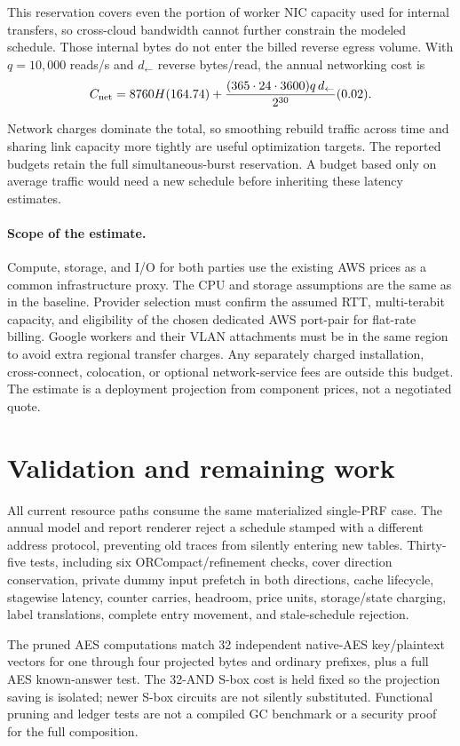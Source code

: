 \documentclass[11pt]{article}
\begin{document}

This reservation covers even the portion of worker NIC capacity used for
internal transfers, so cross-cloud bandwidth cannot further constrain the
modeled schedule. Those internal bytes do not enter the billed reverse
egress volume. With $q=10{,}000$ reads/s and $d_{\leftarrow}$ reverse
bytes/read, the annual networking cost is
\[
 C_{\rm net}=8760H(164.74)
 +\frac{(365\cdot24\cdot3600)q\,d_{\leftarrow}}{2^{30}}(0.02).
\]

Network charges dominate the total, so smoothing rebuild traffic across
time and sharing link capacity more tightly are useful optimization
targets. The reported budgets retain the full simultaneous-burst
reservation. A budget based only on average traffic would need a new
schedule before inheriting these latency estimates.

\paragraph{Scope of the estimate.}
Compute, storage, and I/O for both parties use the existing AWS prices as
a common infrastructure proxy. The CPU and storage assumptions are the
same as in the baseline. Provider selection must confirm the assumed RTT,
multi-terabit capacity, and eligibility of the chosen dedicated AWS
port-pair for flat-rate billing. Google workers and their VLAN attachments
must be in the same region to avoid extra regional transfer charges.
Any separately charged installation, cross-connect, colocation, or
optional network-service fees are outside this budget. The estimate is
a deployment projection from component prices, not a negotiated quote.

\clearpage
\section{Validation and remaining work}
All current resource paths consume the same materialized single-PRF case.
The annual model and report renderer reject a schedule stamped with a
different address protocol, preventing old traces from silently entering
new tables. Thirty-five tests, including six ORCompact/refinement checks,
cover direction conservation, private dummy
input prefetch in both directions, cache lifecycle, stagewise latency,
counter carries, headroom, price units, storage/state charging, label
translations, complete entry movement, and stale-schedule rejection.

The pruned AES computations match 32 independent native-AES key/plaintext
vectors for one through four projected bytes and ordinary prefixes, plus
a full AES known-answer test. The 32-AND S-box cost is held fixed so the
projection saving is isolated; newer S-box circuits are not silently
substituted. Functional pruning and ledger tests are not a compiled GC
benchmark or a security proof for the full composition.
\end{document}
